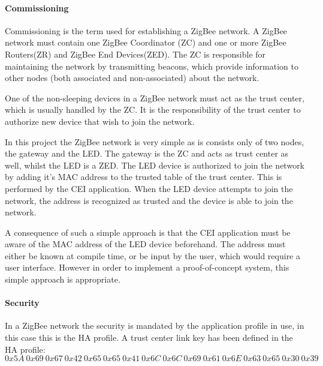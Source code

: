 \documentclass[Main]{subfiles}
\begin{document}
			\paragraph{Commissioning} %
				Commissioning is the term used for establishing a ZigBee network.
				A ZigBee network must contain one ZigBee Coordinator (ZC) and one or more ZigBee Routers(ZR) and ZigBee End Devices(ZED). 
				The ZC is responsible for maintaining the network by transmitting beacons, which provide information to other nodes (both associated and non-associated) about the network.

				One of the non-sleeping devices in a ZigBee network must act as the trust center, which is usually handled by the ZC. 
				It is the responsibility of the trust center to authorize new device that wish to join the network.

				In this project the ZigBee network is very simple as is consists only of two nodes, the gateway and the LED. 
				The gateway is the ZC and acts as trust center as well, whilst the LED is a ZED.
				The LED device is authorized to join the network by adding it's MAC address to the trusted table of the trust center. 
				This is performed by the CEI application.
				When the LED device attempts to join the network, the address is recognized as trusted and the device is able to join the network. 

				A consequence of such a simple approach is that the CEI application must be aware of the MAC address of the LED device beforehand. 
				The address must either be known at compile time, or be input by the user, which would require a user interface. 
				However in order to implement a proof-of-concept system, this simple approach is appropriate. 			
			\label{par:commissioning}
			



			\paragraph{Security} %
				In a ZigBee network the security is mandated by the application profile in use, in this case this is the HA profile.
				A trust center link key has been defined in the HA profile\cite{HASpec}:
				\begin{equation}
					0x5A\ 0x69\ 0x67\ 0x42\ 0x65\ 0x65\ 0x41\ 0x6C\ 0x6C\ 0x69\ 0x61\ 0x6E\ 0x63\ 0x65\ 0x30\ 0x39	
				\end{equation}
				
\end{document}
